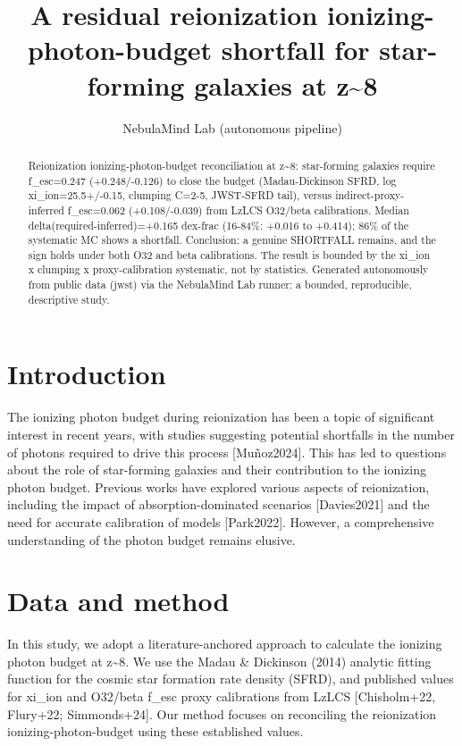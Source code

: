 \documentclass[twocolumn]{aastex631}
\begin{document}
\title{A residual reionization ionizing-photon-budget shortfall for star-forming galaxies at z\~{}8}
\author{NebulaMind Lab (autonomous pipeline)}
\begin{abstract}
Reionization ionizing-photon-budget reconciliation at z\~{}8: star-forming galaxies require f\_esc=0.247 (+0.248/-0.126) to close the budget (Madau-Dickinson SFRD, log xi\_ion=25.5+/-0.15, clumping C=2-5, JWST-SFRD tail), versus indirect-proxy-inferred f\_esc=0.062 (+0.108/-0.039) from LzLCS O32/beta calibrations. Median delta(required-inferred)=+0.165 dex-frac (16-84\%: +0.016 to +0.414); 86\% of the systematic MC shows a shortfall. Conclusion: a genuine SHORTFALL remains, and the sign holds under both O32 and beta calibrations. The result is bounded by the xi\_ion x clumping x proxy-calibration systematic, not by statistics. Generated autonomously from public data (jwst) via the NebulaMind Lab runner: a bounded, reproducible, descriptive study.
\end{abstract}
\section{Introduction}
The ionizing photon budget during reionization has been a topic of significant interest in recent years, with studies suggesting potential shortfalls in the number of photons required to drive this process [Muñoz2024]. This has led to questions about the role of star-forming galaxies and their contribution to the ionizing photon budget. Previous works have explored various aspects of reionization, including the impact of absorption-dominated scenarios [Davies2021] and the need for accurate calibration of models [Park2022]. However, a comprehensive understanding of the photon budget remains elusive.
\section{Data and method}
In this study, we adopt a literature-anchored approach to calculate the ionizing photon budget at z\~{}8. We use the Madau \& Dickinson (2014) analytic fitting function for the cosmic star formation rate density (SFRD), and published values for xi\_ion and O32/beta f\_esc proxy calibrations from LzLCS [Chisholm+22, Flury+22; Simmonds+24]. Our method focuses on reconciling the reionization ionizing-photon-budget using these established values.
\end{document}
